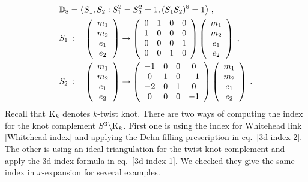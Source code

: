 \documentclass[a4paper,11pt]{article}
\begin{document}
\begin{align}
\begin{split}
&\mathbb{D}_8=\big{\langle} S_1, S_2 : S_1^2 = S_2^2=1, (S_1 S_2)^8 =1 \big{\rangle}\;,
\\
&S_1 \;:\quad \left(\begin{array}{c}m_1 \\ m_2 \\ e_1 \\ e_2\end{array}\right) \rightarrow \left(
\begin{array}{cccc}
 0 & 1 & 0 & 0 \\
 1 & 0 & 0 & 0 \\
 0 & 0 & 0 & 1 \\
 0 & 0 & 1 & 0 \\
\end{array}
\right)  \left(\begin{array}{c}m_1 \\ m_2 \\ e_1 \\ e_2\end{array}\right) \;,
\\
&S_2 \;:\quad \left(\begin{array}{c}m_1 \\ m_2 \\ e_1 \\ e_2\end{array}\right) \rightarrow \left(
\begin{array}{cccc}
 -1 & 0 & 0 & 0 \\
 0 & 1 & 0 & -1 \\
 -2 & 0 & 1 & 0 \\
 0 & 0 & 0 & -1 \\
\end{array}
\right)  \left(\begin{array}{c}m_1 \\ m_2 \\ e_1 \\ e_2\end{array}\right) \;.
\end{split} \label{D_8 of Whitehead}
\end{align}
%
Recall that ${\rm K}_k$ denotes $k$-twist knot. There are two ways of computing the index for the knot complement $S^3\backslash {\rm K}_k$. First one is using the index for Whitehead link \eqref{Whitehead index} and applying the Dehn filling prescription in eq.~\eqref{3d index-2}. The other is using an ideal triangulation for the twist knot complement and apply the 3d index formula in eq.~\eqref{3d index-1}. We checked they  give the same index in $x$-expansion for several examples. 
\end{document}
